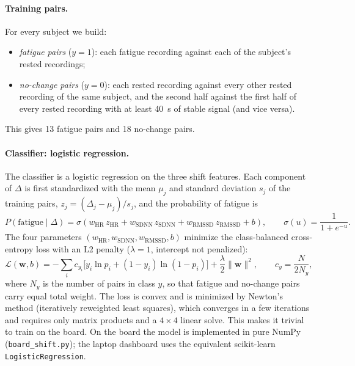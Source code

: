 \documentclass[11pt]{article}
\begin{document}
\paragraph{Training pairs.} For every subject we build:
\begin{itemize}
  \item \emph{fatigue pairs} ($y=1$): each fatigue recording against each of the subject's rested recordings;
  \item \emph{no-change pairs} ($y=0$): each rested recording against every other rested recording of the
  same subject, and the second half against the first half of every rested recording with at least 40~s
  of stable signal (and vice versa).
\end{itemize}
This gives 13 fatigue pairs and 18 no-change pairs.

\paragraph{Classifier: logistic regression.}
The classifier is a logistic regression on the three shift features. Each component of $\Delta$ is first
standardized with the mean $\mu_j$ and standard deviation $s_j$ of the training pairs,
$z_j = (\Delta_j-\mu_j)/s_j$, and the probability of fatigue is
\begin{equation}
P(\text{fatigue}\mid\Delta) = \sigma\!\left(w_{\mathrm{HR}}\,z_{\mathrm{HR}} + w_{\mathrm{SDNN}}\,z_{\mathrm{SDNN}}
+ w_{\mathrm{RMSSD}}\,z_{\mathrm{RMSSD}} + b\right),\qquad \sigma(u)=\frac{1}{1+e^{-u}} .
\end{equation}
The four parameters $(w_{\mathrm{HR}}, w_{\mathrm{SDNN}}, w_{\mathrm{RMSSD}}, b)$ minimize the class-balanced
cross-entropy loss with an L2 penalty ($\lambda=1$, intercept not penalized):
\begin{equation}
\mathcal{L}(\mathbf{w},b) = -\sum_{i} c_{y_i}\Big[y_i\ln p_i + (1-y_i)\ln(1-p_i)\Big] + \frac{\lambda}{2}\lVert\mathbf{w}\rVert^2,
\qquad c_{y} = \frac{N}{2N_{y}},
\end{equation}
where $N_y$ is the number of pairs in class $y$, so that fatigue and no-change pairs carry equal total weight.
The loss is convex and is minimized by Newton's method (iteratively reweighted least squares), which
converges in a few iterations and requires only matrix products and a $4\times4$ linear solve. This makes it
trivial to train on the board. On the board the model is implemented in pure NumPy (\texttt{board\_shift.py});
the laptop dashboard uses the equivalent scikit-learn \texttt{LogisticRegression}.
\end{document}
